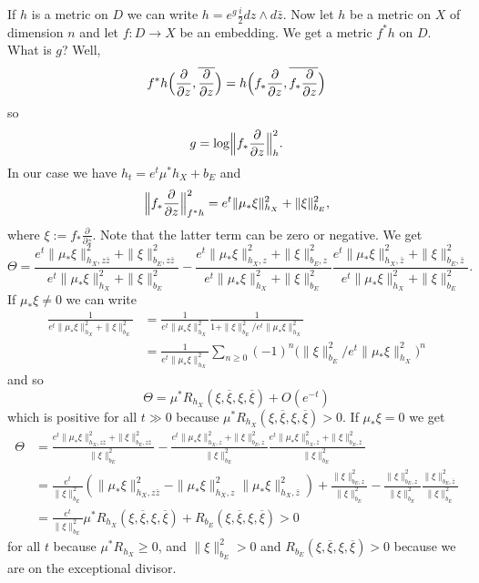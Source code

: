 \documentclass[11pt]{amsart}
\theoremstyle{definition}
\def\ov#1{\overline{#1}}
\begin{document}
If $h$ is a metric on $D$ we can write $h = e^g \frac i2 dz \wedge d\bar z$.
Now let $h$ be a metric on $X$ of dimension $n$ and let $f : D \to X$ be an embedding.
We get a metric $f^*h$ on $D$.
What is $g$?
Well,
$$
f^*h\Bigl(\frac{\partial}{\partial z},\ov{\frac{\partial}{\partial z}}\Bigr)
= h\Bigl(f_*\frac{\partial}{\partial z}, \ov{f_*\frac{\partial}{\partial z}}\Bigr)
$$
so
$$
g = \log \Bigl\|f_*\frac{\partial}{\partial z}\Bigr\|_h^2.
$$
In our case we have $h_t = e^t \mu^*h_X + b_E$ and
$$
\Bigl\|f_*\frac{\partial}{\partial z}\Bigr\|_{f^*h}^2
= e^t\|\mu_*\xi\|_{h_X}^2 + \|\xi\|^2_{b_E},
$$
where $\xi := f_*\frac{\partial}{\partial z}$.
Note that the latter term can be zero or negative.
We get
$$
\Theta
= \frac{e^t\|\mu_*\xi\|_{h_X,z\bar z}^2 + \|\xi\|^2_{b_E,z \bar z} }
{e^t\|\mu_*\xi\|_{h_X}^2 + \|\xi\|^2_{b_E}}
- \frac{e^t\|\mu_*\xi\|_{h_X,z}^2 + \|\xi\|^2_{b_E,z} }
{e^t\|\mu_*\xi\|_{h_X}^2 + \|\xi\|^2_{b_E}}
\frac{e^t\|\mu_*\xi\|_{h_X,\bar z}^2 + \|\xi\|^2_{b_E, \bar z} }
{ e^t\|\mu_*\xi\|_{h_X}^2 + \|\xi\|^2_{b_E} }
.
$$
If $\mu_*\xi \not= 0$ we can write
\begin{align*}
\frac{1}{ e^t\|\mu_*\xi\|_{h_X}^2 + \|\xi\|^2_{b_E} }
&= \frac{1}{e^t\|\mu_*\xi\|_{h_X}^2}
\frac{1}{1 + \|\xi\|^2_{b_E} / e^t\|\mu_*\xi\|_{h_X}^2}
\\
&= \frac{1}{e^t\|\mu_*\xi\|_{h_X}^2}
\sum_{n \geq 0} (-1)^n \bigl(
\|\xi\|^2_{b_E} / e^t\|\mu_*\xi\|_{h_X}^2
\bigr)^n
\end{align*}
and so
$$
\Theta
= \mu^*R_{h_X}(\xi, \ov \xi, \xi, \ov \xi) + O(e^{-t})
$$
which is positive for all $t \gg 0$ because $\mu^*R_{h_X}(\xi, \ov \xi, \xi,
\ov \xi) > 0$.
If $\mu_*\xi = 0$ we get
\begin{align*}
\Theta
&= \frac{e^t\|\mu_*\xi\|_{h_X,z\bar z}^2 + \|\xi\|^2_{b_E,z \bar z} }
{\|\xi\|^2_{b_E}}
- \frac{e^t\|\mu_*\xi\|_{h_X,z}^2 + \|\xi\|^2_{b_E,z} }{\|\xi\|^2_{b_E}}
\frac{e^t\|\mu_*\xi\|_{h_X,\bar z}^2 + \|\xi\|^2_{b_E,\bar z} }{\|\xi\|^2_{b_E}}
\\
&=\frac{e^t}{\|\xi\|^2_{b_E}}
(\|\mu_*\xi\|_{h_X,z\bar z}^2 - \|\mu_*\xi\|_{h_X,z}^2 \|\mu_*\xi\|_{h_X,\bar z}^2 )
+
\frac{\|\xi\|^2_{b_E,z}}{\|\xi\|^2_{b_E}}
- \frac{\|\xi\|^2_{b_E,z} }{\|\xi\|^2_{b_E}}
\frac{\|\xi\|^2_{b_E,\bar z} }{\|\xi\|^2_{b_E}}
\\
&=
\frac{e^t}{\|\xi\|^2_{b_E}}\mu^*R_{h_X}(\xi, \ov \xi, \xi, \ov \xi)
+ R_{b_E}(\xi, \ov \xi, \xi, \ov \xi)
> 0
\end{align*}
for all $t$ because $\mu^*R_{h_X} \geq 0$, and $\|\xi\|^2_{b_E} > 0$ and
$R_{b_E}(\xi, \ov \xi, \xi, \ov \xi) > 0$ because we are
on the exceptional divisor.
\end{document}
